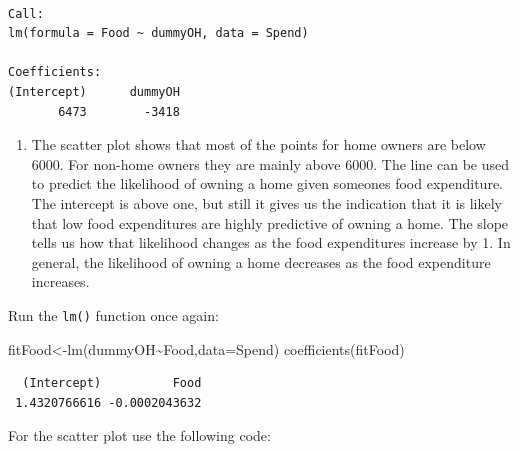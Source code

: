\documentclass[
  letterpaper,
  DIV=11,
  numbers=noendperiod]{scrreprt}
\newenvironment{Shaded}{\begin{snugshade}}{\end{snugshade}}
\newcommand{\AttributeTok}[1]{\textcolor[rgb]{0.40,0.45,0.13}{#1}}
\newcommand{\FunctionTok}[1]{\textcolor[rgb]{0.28,0.35,0.67}{#1}}
\newcommand{\NormalTok}[1]{\textcolor[rgb]{0.00,0.23,0.31}{#1}}
\newcommand{\OtherTok}[1]{\textcolor[rgb]{0.00,0.23,0.31}{#1}}
\newcommand{\SpecialCharTok}[1]{\textcolor[rgb]{0.37,0.37,0.37}{#1}}
\providecommand{\tightlist}{%
  \setlength{\itemsep}{0pt}\setlength{\parskip}{0pt}}\usepackage{longtable,booktabs,array}
\begin{document}
\begin{verbatim}

Call:
lm(formula = Food ~ dummyOH, data = Spend)

Coefficients:
(Intercept)      dummyOH  
       6473        -3418  
\end{verbatim}

\begin{enumerate}
\def\labelenumi{\arabic{enumi}.}
\setcounter{enumi}{2}
\tightlist
\item
  The scatter plot shows that most of the points for home owners are
  below \(6000\). For non-home owners they are mainly above \(6000\).
  The line can be used to predict the likelihood of owning a home given
  someones food expenditure. The intercept is above one, but still it
  gives us the indication that it is likely that low food expenditures
  are highly predictive of owning a home. The slope tells us how that
  likelihood changes as the food expenditures increase by 1. In general,
  the likelihood of owning a home decreases as the food expenditure
  increases.
\end{enumerate}

Run the \texttt{lm()} function once again:

\begin{Shaded}
\begin{Highlighting}[numbers=left,,]
\NormalTok{fitFood}\OtherTok{\textless{}{-}}\FunctionTok{lm}\NormalTok{(dummyOH}\SpecialCharTok{\textasciitilde{}}\NormalTok{Food,}\AttributeTok{data=}\NormalTok{Spend)}
\FunctionTok{coefficients}\NormalTok{(fitFood)}
\end{Highlighting}
\end{Shaded}

\begin{verbatim}
  (Intercept)          Food 
 1.4320766616 -0.0002043632 
\end{verbatim}

For the scatter plot use the following code:
\end{document}
